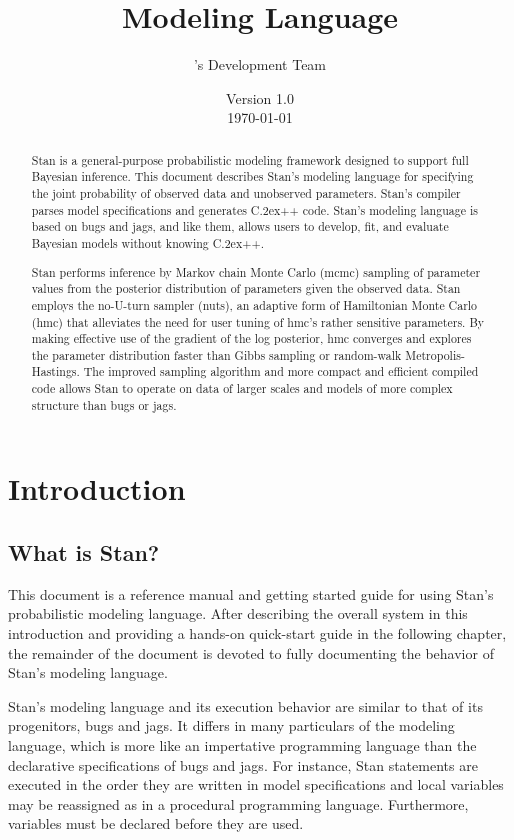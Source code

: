 \documentclass[10pt]{report}
\title{\Huge\bf \Stan Modeling Language}
\author{\Stan's Development Team}
\date{\vspace*{36pt} \Stan Version 1.0 \\[4pt] {\small \today}} %
\newcommand{\Stan}{Stan\xspace}
\newcommand*{\Cpp}{C\raise.2ex\hbox{\footnotesize ++}\xspace} %
\newcommand{\acronym}[1]{{\sc #1}\xspace}
\newcommand{\BUGS}{\acronym{bugs}}
\newcommand{\JAGS}{\acronym{jags}}
\newcommand{\MCMC}{\acronym{mcmc}}
\newcommand{\HMC}{\acronym{hmc}}
\newcommand{\NUTS}{\acronym{nuts}}
\begin{document}
\maketitle

\begin{abstract}
  \Stan is a general-purpose probabilistic modeling framework designed
  to support full Bayesian inference.  This document describes \Stan's
  modeling language for specifying the joint probability of observed
  data and unobserved parameters.  \Stan's compiler parses model
  specifications and generates \Cpp code.  \Stan's modeling language
  is based on \BUGS and \JAGS, and like them, allows users to develop,
  fit, and evaluate Bayesian models without knowing \Cpp.

  \Stan performs inference by Markov chain Monte Carlo (\MCMC)
  sampling of parameter values from the posterior distribution of
  parameters given the observed data.  \Stan employs the no-U-turn
  sampler (\NUTS), an adaptive form of Hamiltonian Monte Carlo (\HMC)
  that alleviates the need for user tuning of \HMC's rather sensitive
  parameters.  By making effective use of the gradient of the log
  posterior, \HMC converges and explores the parameter distribution
  faster than Gibbs sampling or random-walk Metropolis-Hastings.  The
  improved sampling algorithm and more compact and efficient compiled
  code allows \Stan to operate on data of larger scales and models of
  more complex structure than \BUGS or \JAGS.
\end{abstract}

\tableofcontents

\part{Introduction}

\chapter{What is \Stan?}

This document is a reference manual and getting started guide for
using \Stan's probabilistic modeling language.  After describing the
overall system in this introduction and providing a hands-on
quick-start guide in the following chapter, the remainder of the
document is devoted to fully documenting the behavior of
Stan's modeling language.

\Stan's modeling language and its execution behavior are similar to
that of its progenitors, \BUGS and \JAGS.  It differs in many
particulars of the modeling language, which is more like an
impertative programming language than the declarative specifications
of \BUGS and \JAGS.  For instance, \Stan statements are executed in
the order they are written in model specifications and local variables
may be reassigned as in a procedural programming language.
Furthermore, variables must be declared before they are used.
\end{document}

